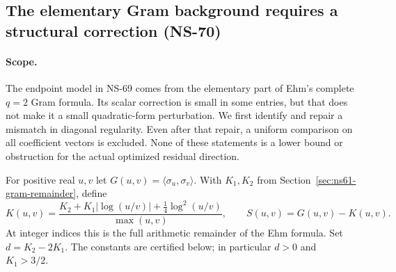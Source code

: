 \documentclass[11pt]{article}
\theoremstyle{remark}
\begin{document}
\subsection{The elementary Gram background requires a structural correction (NS-70)}
\label{sec:ns70-background}

\paragraph{Scope.}
The endpoint model in NS-69 comes from the elementary part of Ehm's
complete $q=2$ Gram formula. Its scalar correction is small in some
entries, but that does not make it a small quadratic-form perturbation.
We first identify and repair a mismatch in diagonal regularity. Even
after that repair, a uniform comparison on all coefficient vectors is
excluded. None of these statements is a lower bound or obstruction
for the actual optimized residual direction.

For positive real $u,v$ let $G(u,v)=\langle\sigma_u,\sigma_v\rangle$.
With $K_1,K_2$ from Section~\ref{sec:ns61-gram-remainder}, define
\[
 K(u,v)=\frac{K_2+K_1|\log(u/v)|+\tfrac14\log^2(u/v)}{\max(u,v)},
 \qquad S(u,v)=G(u,v)-K(u,v).
\]
At integer indices this is the full arithmetic remainder of the Ehm
formula. Set $d=K_2-2K_1$. The constants are certified below; in
particular $d>0$ and $K_1>3/2$.
\end{document}
